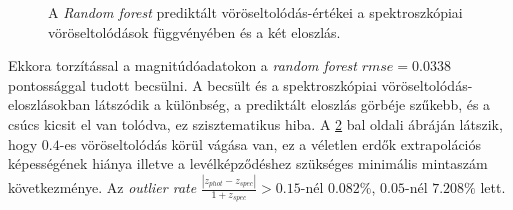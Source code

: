 \documentclass[12pt,letterpaper,oneside,openright]{book}
\begin{document}
\begin{figure}[h!]
\begin{subfigure}[b]{0.3\textwidth}
    \label{fig:2}
  \end{subfigure}
  \caption{A \textit{Random forest} prediktált vöröseltolódás-értékei a spektroszkópiai vöröseltolódások függvényében és a két eloszlás.}
\label{rfp}
\end{figure}
 Ekkora torzítással a magnitúdóadatokon a \textit{random forest} $rmse = 0.0338$ pontossággal tudott becsülni. A becsült és a spektroszkópiai vöröseltolódás-eloszlásokban látszódik a különbség, a prediktált eloszlás görbéje szűkebb, és a csúcs kicsit el van tolódva, ez szisztematikus hiba. A \ref{rfp} bal oldali ábráján látszik, hogy $0.4$-es vöröseltolódás körül vágása van, ez a véletlen erdők extrapolációs képességének hiánya illetve a levélképződéshez szükséges minimális mintaszám következménye. 
 \newline \indent
Az \textit{outlier rate} $\frac{|z_{phot}-z_{spec}|}{1+z_{spec}} >0.15$-nél $0.082\%$, $0.05$-nél $7.208\%$ lett.
 
\end{document}
